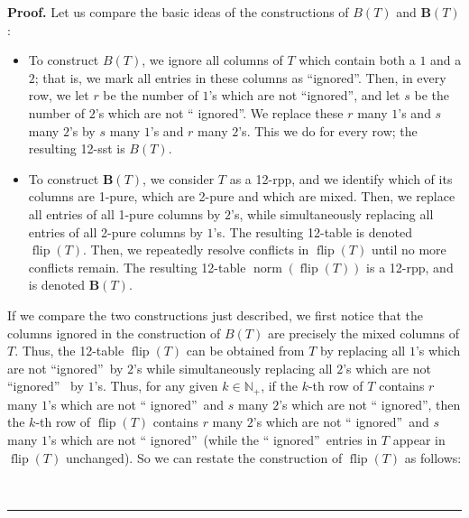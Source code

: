 \documentclass[numbers=enddot,12pt,final,onecolumn,notitlepage]{scrartcl}%
\theoremstyle{definition}
\newenvironment{proof}[1][Proof]{\noindent\textbf{#1.} }{\ \rule{0.5em}{0.5em}}
\begin{document}
\begin{proof}
Let us compare the basic ideas of the constructions of $B\left(  T\right)  $
and $\mathbf{B}\left(  T\right)  $:

\begin{itemize}
\item To construct $B\left(  T\right)  $, we ignore all columns of $T$ which
contain both a $1$ and a $2$; that is, we mark all entries in these columns as
\textquotedblleft ignored\textquotedblright. Then, in every row, we let $r$ be
the number of $1$'s which are not \textquotedblleft ignored\textquotedblright,
and let $s$ be the number of $2$'s which are not \textquotedblleft
ignored\textquotedblright. We replace these $r$ many $1$'s and $s$ many $2$'s
by $s$ many $1$'s and $r$ many $2$'s. This we do for every row; the resulting
12-sst is $B\left(  T\right)  $.

\item To construct $\mathbf{B}\left(  T\right)  $, we consider $T$ as a
12-rpp, and we identify which of its columns are 1-pure, which are 2-pure and
which are mixed. Then, we replace all entries of all 1-pure columns by $2$'s,
while simultaneously replacing all entries of all 2-pure columns by $1$'s. The
resulting 12-table is denoted $\operatorname*{flip}\left(  T\right)  $. Then,
we repeatedly resolve conflicts in $\operatorname*{flip}\left(  T\right)  $
until no more conflicts remain. The resulting 12-table $\operatorname*{norm}%
\left(  \operatorname*{flip}\left(  T\right)  \right)  $ is a 12-rpp, and is
denoted $\mathbf{B}\left(  T\right)  $.
\end{itemize}

If we compare the two constructions just described, we first notice that the
columns ignored in the construction of $B\left(  T\right)  $ are precisely the
mixed columns of $T$. Thus, the 12-table $\operatorname*{flip}\left(
T\right)  $ can be obtained from $T$ by replacing all $1$'s which are not
\textquotedblleft ignored\textquotedblright\ by $2$'s while simultaneously
replacing all $2$'s which are not \textquotedblleft ignored\textquotedblright%
\ by $1$'s. Thus, for any given $k\in\mathbb{N}_{+}$, if the $k$-th row of $T$
contains $r$ many $1$'s which are not \textquotedblleft
ignored\textquotedblright\ and $s$ many $2$'s which are not \textquotedblleft
ignored\textquotedblright, then the $k$-th row of $\operatorname*{flip}\left(
T\right)  $ contains $r$ many $2$'s which are not \textquotedblleft
ignored\textquotedblright\ and $s$ many $1$'s which are not \textquotedblleft
ignored\textquotedblright\ (while the \textquotedblleft
ignored\textquotedblright\ entries in $T$ appear in $\operatorname*{flip}%
\left(  T\right)  $ unchanged). So we can restate the construction of
$\operatorname*{flip}\left(  T\right)  $ as follows:


\end{proof}
\end{document}

